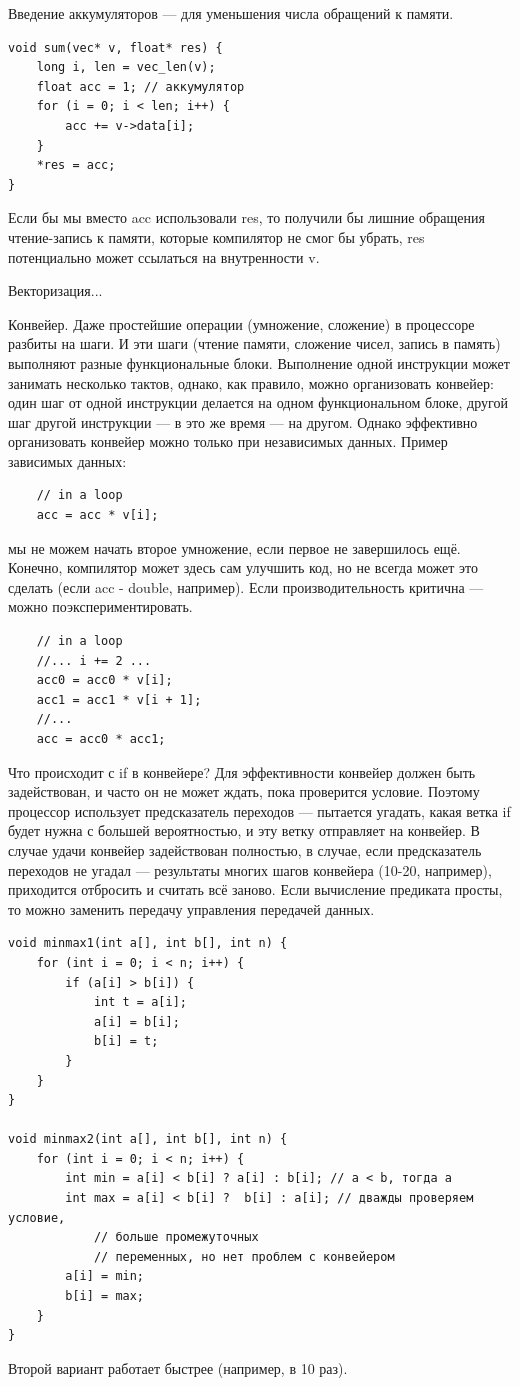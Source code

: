 \documentclass{book}
\begin{document}
Введение аккумуляторов --- для уменьшения числа обращений к памяти.
\begin{verbatim}
void sum(vec* v, float* res) {
    long i, len = vec_len(v);
    float acc = 1; // аккумулятор
    for (i = 0; i < len; i++) {
        acc += v->data[i];
    }
    *res = acc;
}
\end{verbatim}
Если бы мы вместо acc использовали res, то получили бы лишние обращения чтение-запись к памяти,
которые компилятор не смог бы убрать, res потенциально может ссылаться на внутренности v.

Векторизация...

Конвейер. Даже простейшие операции (умножение, сложение) в процессоре разбиты на шаги. И эти шаги
(чтение памяти, сложение чисел, запись в память) выполняют разные функциональные блоки. Выполнение
одной инструкции может занимать несколько тактов, однако, как правило, можно организовать конвейер:
один шаг от одной инструкции делается на одном функциональном блоке, другой шаг другой инструкции
--- в это же время --- на другом. Однако эффективно организовать конвейер можно только при
независимых данных. Пример зависимых данных:
\begin{verbatim}
    // in a loop
    acc = acc * v[i];
\end{verbatim}
мы не можем начать второе умножение, если первое не завершилось ещё. Конечно, компилятор может
здесь сам улучшить код, но не всегда может это сделать (если acc - double, например). Если
производительность критична --- можно поэкспериментировать.
\begin{verbatim}
    // in a loop
    //... i += 2 ...
    acc0 = acc0 * v[i];
    acc1 = acc1 * v[i + 1];
    //...
    acc = acc0 * acc1;
\end{verbatim}

Что происходит с if в конвейере? Для эффективности конвейер должен быть задействован, и часто он не
может ждать, пока проверится условие. Поэтому процессор использует предсказатель переходов ---
пытается угадать, какая ветка if будет нужна с большей вероятностью, и эту ветку отправляет на
конвейер. В случае удачи конвейер задействован полностью, в случае, если предсказатель переходов не
угадал --- результаты многих шагов конвейера (10-20, например), приходится отбросить и считать всё
заново. Если вычисление предиката просты, то можно заменить передачу управления передачей данных.
\begin{verbatim}
void minmax1(int a[], int b[], int n) {
    for (int i = 0; i < n; i++) {
        if (a[i] > b[i]) {
            int t = a[i];
            a[i] = b[i];
            b[i] = t;
        }
    }
}

void minmax2(int a[], int b[], int n) {
    for (int i = 0; i < n; i++) {
        int min = a[i] < b[i] ? a[i] : b[i]; // a < b, тогда a
        int max = a[i] < b[i] ?  b[i] : a[i]; // дважды проверяем условие,
            // больше промежуточных
            // переменных, но нет проблем с конвейером
        a[i] = min;
        b[i] = max;
    }
}
\end{verbatim}
Второй вариант работает быстрее (например, в 10 раз).
\end{document}
